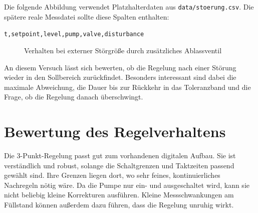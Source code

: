 \documentclass[12pt,a4paper]{scrartcl}
\begin{document}
Die folgende Abbildung verwendet Platzhalterdaten aus \texttt{data/stoerung.csv}. Die spätere reale Messdatei sollte diese Spalten enthalten:

\begin{center}
\texttt{t,setpoint,level,pump,valve,disturbance}
\end{center}

\begin{figure}[H]
  \centering
  \caption{Verhalten bei externer Störgröße durch zusätzliches Ablassventil}
\end{figure}

An diesem Versuch lässt sich bewerten, ob die Regelung nach einer Störung wieder in den Sollbereich zurückfindet. Besonders interessant sind dabei die maximale Abweichung, die Dauer bis zur Rückkehr in das Toleranzband und die Frage, ob die Regelung danach überschwingt.

\section{Bewertung des Regelverhaltens}

Die 3-Punkt-Regelung passt gut zum vorhandenen digitalen Aufbau. Sie ist verständlich und robust, solange die Schaltgrenzen und Taktzeiten passend gewählt sind. Ihre Grenzen liegen dort, wo sehr feines, kontinuierliches Nachregeln nötig wäre. Da die Pumpe nur ein- und ausgeschaltet wird, kann sie nicht beliebig kleine Korrekturen ausführen. Kleine Messschwankungen am Füllstand können außerdem dazu führen, dass die Regelung unruhig wirkt.
\end{document}
